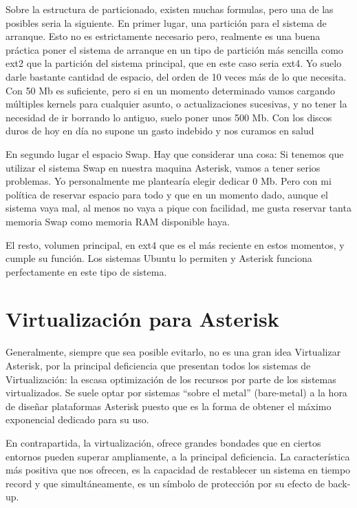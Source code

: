 \begin{enumerate}
Sobre la estructura de particionado, existen muchas formulas, pero una de las posibles seria la siguiente. En primer lugar, una partición para el sistema de arranque. Esto no es estrictamente necesario pero, realmente es una buena práctica poner el sistema de arranque en un tipo de partición más sencilla como ext2 que la partición del sistema principal, que en este caso seria ext4. Yo suelo darle bastante cantidad de espacio, del orden de 10 veces más de lo que necesita. Con 50 Mb es suficiente, pero si en un momento determinado vamos cargando múltiples kernels para cualquier asunto, o actualizaciones sucesivas, y no tener la necesidad de ir borrando lo antiguo, suelo poner unos 500 Mb. Con los discos duros de hoy en día no supone un gasto indebido y nos curamos en salud

En segundo lugar el espacio Swap. Hay que considerar una cosa: Si tenemos que utilizar el sistema Swap en nuestra maquina Asterisk, vamos a tener serios problemas. Yo personalmente me plantearía elegir dedicar 0 Mb. Pero con mi política de reservar espacio para todo y que en un momento dado, aunque el sistema vaya mal, al menos no vaya a pique con facilidad, me gusta reservar tanta memoria Swap como memoria RAM disponible haya.

El resto, volumen principal, en ext4 que es el más reciente en estos momentos, y cumple su función. Los sistemas Ubuntu lo permiten y Asterisk funciona perfectamente en este tipo de sistema.

\end{enumerate}

\section{Virtualización para Asterisk}

Generalmente, siempre que sea posible evitarlo, no es una gran idea Virtualizar Asterisk, por la principal deficiencia que presentan todos los sistemas de Virtualización: la escasa optimización de los recursos por parte de los sistemas virtualizados. Se suele optar por sistemas “sobre el metal” (bare-metal) a la hora de diseñar plataformas Asterisk puesto que es la forma de obtener el máximo exponencial dedicado para su uso.

En contrapartida, la virtualización, ofrece grandes bondades que en ciertos entornos pueden superar ampliamente, a la principal deficiencia. La característica más positiva que nos ofrecen, es la capacidad de restablecer un sistema en tiempo record y que simultáneamente, es un símbolo de protección por su efecto de back-up.

